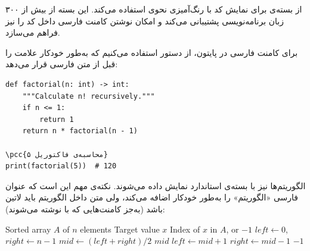  از بسته‌ی  برای نمایش کد
با رنگ‌آمیزی نحوی استفاده می‌کند. این بسته از بیش
از ۳۰۰ زبان برنامه‌نویسی پشتیبانی می‌کند و امکان
نوشتن کامنت فارسی داخل کد را نیز فراهم می‌سازد.

برای کامنت فارسی در پایتون، از دستور 
استفاده می‌کنیم که به‌طور خودکار علامت \lr{\#} را
قبل از متن فارسی قرار می‌دهد:

\begin{latin}
\begin{verbatim}
def factorial(n: int) -> int:
    """Calculate n! recursively."""
    if n <= 1:
        return 1
    return n * factorial(n - 1)

\pcc{محاسبه‌ی فاکتوریل ۵}
print(factorial(5))  # 120
\end{verbatim}
\end{latin}
\label{code:factorial-intro}



الگوریتم‌ها نیز با بسته‌ی استاندارد 
نمایش داده می‌شوند. نکته‌ی مهم این است که
 عنوان فارسی «الگوریتم» را به‌طور
خودکار اضافه می‌کند، ولی متن داخل الگوریتم باید
لاتین باشد (به‌جز کامنت‌هایی که با  نوشته
می‌شوند):

\begin{latin}
\begin{algorithm}
\caption{جستجوی دودویی}
\label{alg:binary-intro}
\begin{algorithmic}[1]
    \Require Sorted array $A$ of $n$ elements
    \Require Target value $x$
    \Ensure Index of $x$ in $A$, or $-1$
    \State $left \gets 0$, $right \gets n - 1$
        \State $mid \gets (left + right) / 2$
            \State \Return $mid$  
            \State $left \gets mid + 1$  
        \Else
            \State $right \gets mid - 1$  
        \EndIf
    \EndWhile
    \State \Return $-1$  
\end{algorithmic}
\end{algorithm}
\end{latin}

